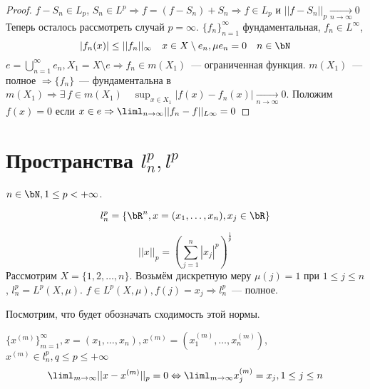\documentclass[document]{subfiles}
\begin{document}
\begin{proof}
    $f - S_n \in L_p$, $S_n \in L^p \Rightarrow f = (f - S_n) + S_n \Rightarrow f \in L_p$ и $ ||f - S_n||_p \underset{n \to \infty}{\longrightarrow} 0$ \\
    Теперь осталось рассмотреть случай $p = \infty$. $\{ f_n \}^\infty_{n=1}$ фундаментальная, $f_n \in L^\infty$, 
    \[ |f_n(x)| \leq ||f_n||_\infty \quad x \in X \setminus e_n, \mu e_n = 0 \quad n \in \bN \]
    $ e = \bigcup^\infty_{n=1} e_n, X_1 = X \setminus e \Rightarrow f_n \in m(X_1)$~--- ограниченная функция. $m(X_1)$~--- полное $\Rightarrow \{f_n\}$~--- фундаментальна в 
    $m(X_1) \Rightarrow \exists \, f \in m(X_1) \quad \sup_{x \in X_1} |f(x) - f_n(x)| \underset{n \to \infty}{\longrightarrow} 0$. Положим
    $f(x) = 0$ если $x \in e \Rightarrow \liml_{n \to \infty} ||f_n - f||_{L\infty} = 0 $
 \end{proof}

 \section{Пространства $l_n^p, l^p$}

 $n \in \bN, 1 \leq p < +\infty$.
 \begin{definition}
    \[ l^p_n = \left\{ \bR^n, x = (x_1, \ldots, x_n), x_j \in \bR \right\} \]
 \end{definition}
 \[ ||x||_p = \left( \sum^n_{j=1} |x_j|^p\right)^{\frac{1}{p}} \]
Рассмотрим $X = \{ 1,2, \ldots, n\}$. Возьмём дискретную меру $\mu(j) = 1$ при $1 \leq j \leq n$, $l^p_n = L^p(X, \mu)$.
$f \in L^p(X, \mu), f(j) = x_j \Rightarrow l^p_n$~--- полное.

Посмотрим, что будет обозначать сходимость этой нормы.

\begin{theorem}
    $\{ x^{(m)} \}^\infty_{m=1}, x = (x_1, \ldots, x_n), x^{(m)} = (x_1^{(m)}, \ldots, x_n^{(m)})$, $x^{(m)} \in l^p_n, q \leq p \leq + \infty$
    \[ \liml_{m \to \infty} ||x - x^{(m)}||_p = 0 \Leftrightarrow \liml_{m \to \infty} x_j^{(m)} = x_j, 1 \leq j \leq n \]
\end{theorem}
\end{document}
